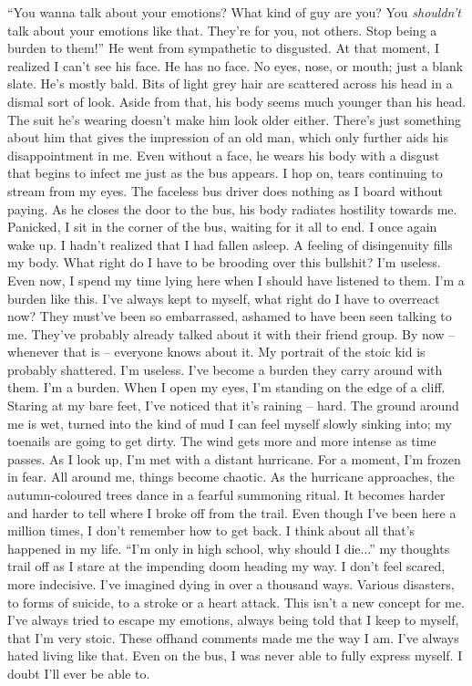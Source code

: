 \documentclass[a4paper, 12pt]{book}
\newcommand\tab[1][1cm]{\hspace*{#1}}
\begin{document}
\newline
\tab
``You wanna talk about your emotions? What kind of guy are you? You \textit{shouldn’t} talk about your emotions like that. They’re for you, not others. Stop being a burden to them!'' He went from sympathetic to disgusted. At that moment, I realized I can’t see his face. He has no face. No eyes, nose, or mouth; just a blank slate. He’s mostly bald. Bits of light grey hair are scattered across his head in a dismal sort of look. Aside from that, his body seems much younger than his head. The suit he’s wearing doesn’t make him look older either. There’s just something about him that gives the impression of an old man, which only further aids his disappointment in me.
\newline
\tab
Even without a face, he wears his body with a disgust that begins to infect me just as the bus appears. I hop on, tears continuing to stream from my eyes. The faceless bus driver does nothing as I board without paying. As he closes the door to the bus, his body radiates hostility towards me. Panicked, I sit in the corner of the bus, waiting for it all to end.
\newline
\tab
I once again wake up. I hadn’t realized that I had fallen asleep. A feeling of disingenuity fills my body. What right do I have to be brooding over this bullshit? I’m useless. Even now, I spend my time lying here when I should have listened to them. I’m a burden like this. I’ve always kept to myself, what right do I have to overreact now? They must’ve been so embarrassed, ashamed to have been seen talking to me. They’ve probably already talked about it with their friend group. By now -- whenever that is -- everyone knows about it. My portrait of the stoic kid is probably shattered. I’m useless. I’ve become a burden they carry around with them. I’m a burden.
\newline
\tab
When I open my eyes, I’m standing on the edge of a cliff. Staring at my bare feet, I’ve noticed that it’s raining -- hard. The ground around me is wet, turned into the kind of mud I can feel myself slowly sinking into; my toenails are going to get dirty. The wind gets more and more intense as time passes. As I look up, I’m met with a distant hurricane. For a moment, I’m frozen in fear.
\newline
\tab
All around me, things become chaotic. As the hurricane approaches, the autumn-coloured trees dance in a fearful summoning ritual. It becomes harder and harder to tell where I broke off from the trail. Even though I’ve been here a million times, I don’t remember how to get back. I think about all that’s happened in my life. ``I’m only in high school, why should I die...'' my thoughts trail off as I stare at the impending doom heading my way. I don’t feel scared, more indecisive. I’ve imagined dying in over a thousand ways. Various disasters, to forms of suicide, to a stroke or a heart attack. This isn’t a new concept for me. I’ve always tried to escape my emotions, always being told that I keep to myself, that I'm very stoic. These offhand comments made me the way I am. I’ve always hated living like that. Even on the bus, I was never able to fully express myself. I doubt I’ll ever be able to.
\end{document}
